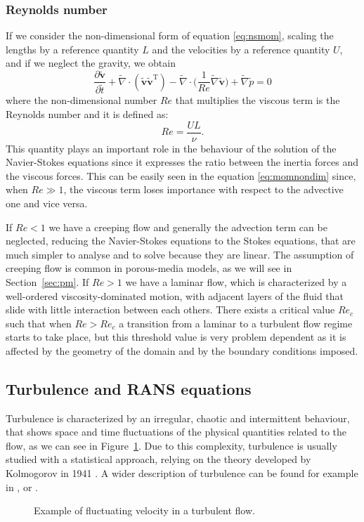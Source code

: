 \subsubsection{Reynolds number}
If we consider the non-dimensional form of equation \eqref{eq:nsmom}, scaling 
the lengths by a reference quantity $L$ and the velocities by a reference 
quantity $U$, and if we neglect the gravity, we obtain
\begin{equation} \label{eq:momnondim}
	\frac{\partial{\tilde{\mathbf{v}}}}{\partial \tilde{t}} + \tilde{\nabla} 
	\cdot (\tilde{\mathbf{v}} \tilde{\mathbf{v}}^\mathrm{T}) - \tilde{\nabla} 
	\cdot \bigg(\frac{1}{Re} \tilde{\nabla} \tilde{\mathbf{v}}\bigg) + 
	\tilde{\nabla} 
	\tilde{p} = 0
\end{equation}
where the non-dimensional number $Re$ that multiplies the viscous term is the 
Reynolds number and it is defined as:
\begin{equation}
Re = \frac{UL}{\nu}.
\end{equation}
This quantity plays an important role in the behaviour of the solution of the 
Navier-Stokes equations since it expresses the ratio between the inertia forces 
and the viscous forces. This can be easily seen in the equation 
\eqref{eq:momnondim} since, when $Re\gg 1$, the viscous term loses 
importance with respect to the advective one and vice versa.

If $Re < 1$ we have a creeping flow and generally the advection term can 
be neglected, reducing the Navier-Stokes equations to the Stokes equations, 
that are much simpler to analyse and to solve because they are linear. The 
assumption of creeping flow is common in porous-media models, as we will 
see in Section~\ref{sec:pm}. If $Re>1$ we have a laminar flow, which is 
characterized by a well-ordered viscosity-dominated motion, with adjacent 
layers of the fluid that slide with little interaction between each others.
There exists a critical value $Re_c$ such that when $Re>Re_c$ a 
transition from a laminar to a turbulent flow regime starts to take place, but 
this threshold value is very problem dependent as it is affected by the 
geometry of the domain and by the boundary conditions imposed.
%
\subsection{Turbulence and RANS equations}
Turbulence is characterized by an irregular, chaotic and intermittent 
behaviour, that shows space and time fluctuations of the physical quantities 
related to the flow, as we can see in Figure~\ref{fig:fluctuations}. Due to 
this complexity, turbulence is usually studied with 
a statistical approach, relying on the theory developed by Kolmogorov 
in 1941 \cite{turbo:kolmogorov}. A wider description of turbulence can be 
found for example in \cite{main:pope}, \cite{main:wilcox} or 
\cite{main:davidson}.
\begin{figure}[ht]
	\centering
	
	\caption[Fluctuating velocity in a turbulent flow]{Example of fluctuating 
	velocity in a turbulent flow.} %
	\label{fig:fluctuations}
\end{figure}

